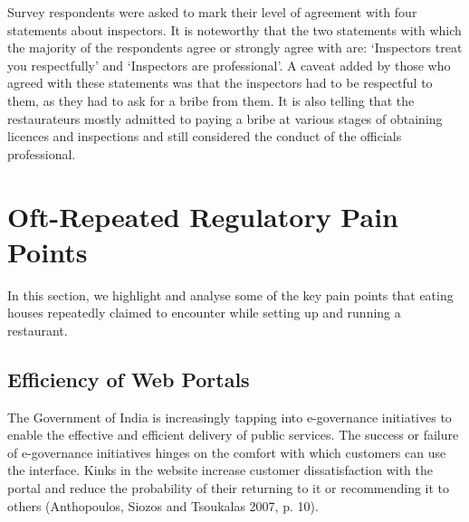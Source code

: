 \documentclass[a4paper, 12pt]{article}
\begin{document}
		Survey respondents were asked to mark their level of agreement with four statements about inspectors. It is noteworthy that the two statements with which the majority of the respondents agree or strongly agree with are: ‘Inspectors treat you respectfully’ and ‘Inspectors are professional’. A caveat added by those who agreed with these statements was that the inspectors had to be respectful to them, as they had to ask for a bribe from them. It is also telling that the restaurateurs mostly admitted to paying a bribe at various stages of obtaining licences and inspections and still considered the conduct of the officials professional.
		




		\section{Oft-Repeated Regulatory Pain Points}
		\label{sec:3}
		
		In this section, we highlight and analyse some of the key pain points that eating houses repeatedly claimed to encounter while setting up and running a restaurant.
		
		\subsection{Efficiency of Web Portals}
		The Government of India is increasingly tapping into e-governance initiatives to enable the effective and efficient delivery of public services. The success or failure of e-governance initiatives hinges on the comfort with which customers can use the interface. Kinks in the website increase customer dissatisfaction with the portal and reduce the probability of their returning to it or recommending it to others (Anthopoulos, Siozos and Tsoukalas 2007, p. 10). 
		
\end{document}
